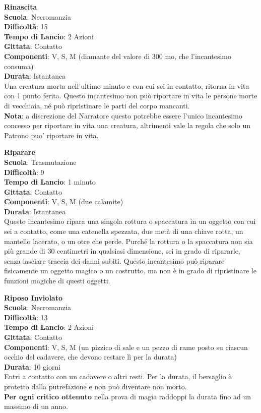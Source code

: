 \begin{multicols}{2}
\medskip\textbf{Rinascita}\\
\textbf{Scuola}: Necromanzia\\
\textbf{Difficoltà}: 15\\
\textbf{Tempo di Lancio}: 2 Azioni\\
\textbf{Gittata}: Contatto\\
\textbf{Componenti}: V, S, M (diamante del valore di 300 mo, che l'incantesimo consuma)\\
\textbf{Durata}: Istantanea\\
Una creatura morta nell'ultimo minuto e con cui sei in contatto, ritorna in vita con 1 punto ferita. Questo incantesimo non può riportare in vita le persone morte di vecchiaia, né può ripristinare le parti del corpo mancanti.\\
\textbf{Nota}: a discrezione del Narratore questo potrebbe essere l'unico incantesimo concesso per riportare in vita una creatura, altrimenti vale la regola che solo un Patrono puo' riportare in vita.

\medskip\textbf{Riparare}\\
\textbf{Scuola}: Trasmutazione\\
\textbf{Difficoltà}: 9\\
\textbf{Tempo di Lancio}: 1 minuto\\
\textbf{Gittata}: Contatto\\
\textbf{Componenti}: V, S, M (due calamite)\\
\textbf{Durata}: Istantanea\\
Questo incantesimo ripara una singola rottura o spaccatura in un oggetto con cui sei a contatto, come una catenella spezzata, due metà di una chiave rotta, un mantello lacerato, o un otre che perde. Purché la rottura o la spaccatura non sia più grande di 30 centimetri in qualsiasi dimensione, sei in grado di ripararle, senza lasciare traccia dei danni subiti. Questo incantesimo può riparare fisicamente un oggetto magico o un costrutto, ma non è in grado di ripristinare le funzioni magiche di questi oggetti.

\medskip\textbf{Riposo Inviolato}\\
\textbf{Scuola}: Necromanzia\\
\textbf{Difficoltà}: 13\\
\textbf{Tempo di Lancio}: 2 Azioni\\
\textbf{Gittata}: Contatto\\
\textbf{Componenti}: V, S, M (un pizzico di sale e un pezzo di rame posto su ciascun occhio del cadavere, che devono restare lì per la durata)\\
\textbf{Durata}: 10 giorni\\
Entri a contatto con un cadavere o altri resti. Per la durata, il bersaglio è protetto dalla putrefazione e non può diventare non morto. \\
\textbf{Per ogni critico ottenuto} nella prova di magia raddoppi la durata fino ad un massimo di un anno.


\end{multicols}
